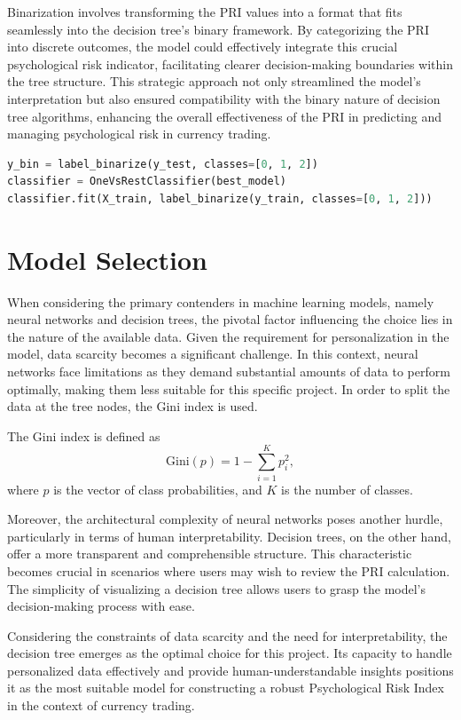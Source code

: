 \documentclass{article}
\begin{document}
Binarization involves transforming the PRI values into a format that fits seamlessly into the decision tree's binary framework. By categorizing the PRI into discrete outcomes, the model could effectively integrate this crucial psychological risk indicator, facilitating clearer decision-making boundaries within the tree structure. This strategic approach not only streamlined the model's interpretation but also ensured compatibility with the binary nature of decision tree algorithms, enhancing the overall effectiveness of the PRI in predicting and managing psychological risk in currency trading.

\begin{lstlisting}[language=Python, caption={Binarizing PRI}, label={lst:python}]
y_bin = label_binarize(y_test, classes=[0, 1, 2])
classifier = OneVsRestClassifier(best_model)
classifier.fit(X_train, label_binarize(y_train, classes=[0, 1, 2]))
\end{lstlisting}



\section{Model Selection}
When considering the primary contenders in machine learning models, namely neural networks and decision trees, the pivotal factor influencing the choice lies in the nature of the available data. Given the requirement for personalization in the model, data scarcity becomes a significant challenge. In this context, neural networks face limitations as they demand substantial amounts of data to perform optimally, making them less suitable for this specific project. In order to split the data at the tree nodes, the Gini index is used.

The Gini index is defined as
\[
\text{Gini}(p) = 1 - \sum_{i=1}^{K} p_i^2,
\]
where \(p\) is the vector of class probabilities, and \(K\) is the number of classes.

Moreover, the architectural complexity of neural networks poses another hurdle, particularly in terms of human interpretability. Decision trees, on the other hand, offer a more transparent and comprehensible structure. This characteristic becomes crucial in scenarios where users may wish to review the PRI calculation. The simplicity of visualizing a decision tree allows users to grasp the model's decision-making process with ease.

Considering the constraints of data scarcity and the need for interpretability, the decision tree emerges as the optimal choice for this project. Its capacity to handle personalized data effectively and provide human-understandable insights positions it as the most suitable model for constructing a robust Psychological Risk Index in the context of currency trading.
\end{document}
